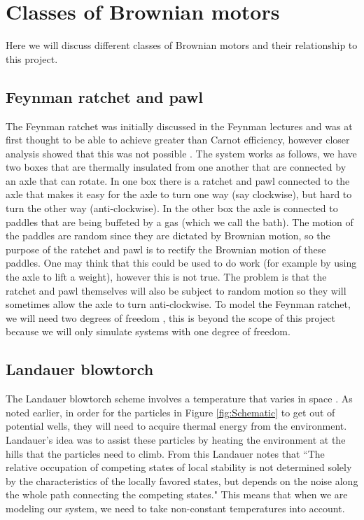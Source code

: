 \section{Classes of Brownian motors} \label{BrownianMotorClasses}
Here we will discuss different classes of Brownian motors and their relationship to this project.

\subsection{Feynman ratchet and pawl}
The Feynman ratchet was initially discussed in the Feynman lectures \cite{Feynman1963} and was at first thought to be able to achieve greater than Carnot efficiency, however closer analysis showed that this was not possible \cite{ParrondoEspanol1996}. The system works as follows, we have two boxes that are thermally insulated from one another that are connected by an axle that can rotate. In one box there is a ratchet and pawl connected to the axle that makes it easy for the axle to turn one way (say clockwise), but hard to turn the other way (anti-clockwise). In the other box the axle is connected to paddles that are being buffeted by a gas (which we call the bath). The motion of the paddles are random since they are dictated by Brownian motion, so the purpose of the ratchet and pawl is to rectify the Brownian motion of these paddles. One may think that this could be used to do work (for example by using the axle to lift a weight), however this is not true. The problem is that the ratchet and pawl themselves will also be subject to random motion so they will sometimes allow the axle to turn anti-clockwise. To model the Feynman ratchet, we will need two degrees of freedom \cite{M.W.Jack2016}, this is beyond the scope of this project because we will only simulate systems with one degree of freedom.

\subsection{Landauer blowtorch}
The Landauer blowtorch scheme involves a temperature that varies in space \cite{Landauer1988}. As noted earlier, in order for the particles in Figure \ref{fig:Schematic} to get out of potential wells, they will need to acquire thermal energy from the environment. Landauer's idea was to assist these particles by heating the environment at the hills that the particles need to climb. From this Landauer notes that \cite{Landauer1988} ``The relative occupation of competing states of local stability is not determined solely by the characteristics of the locally favored states, but depends on the noise along the whole path connecting the competing states." This means that when we are modeling our system, we need to take non-constant temperatures into account.

